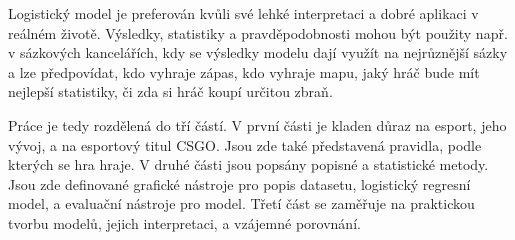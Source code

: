 Logistický model je preferován kvůli své lehké interpretaci a 
dobré aplikaci v reálném životě. Výsledky, statistiky a pravděpodobnosti mohou být použity např. v sázkových kancelářích, kdy se výsledky modelu
dají využít na nejrůznější sázky a lze předpovídat,
kdo vyhraje zápas, kdo vyhraje mapu, jaký hráč bude mít nejlepší statistiky, či zda si hráč koupí určitou zbraň.

Práce je tedy rozdělená do tří částí. V první části je kladen důraz na esport, jeho vývoj, a na esportový titul \ac{CSGO}. Jsou zde také představená pravidla, podle kterých se
hra hraje. V druhé části jsou popsány popisné a statistické metody. Jsou zde definované grafické nástroje pro popis datasetu, logistický regresní model, a evaluační nástroje
pro model. Třetí část se zaměřuje na praktickou tvorbu modelů, jejich interpretaci, a vzájemné porovnání.
